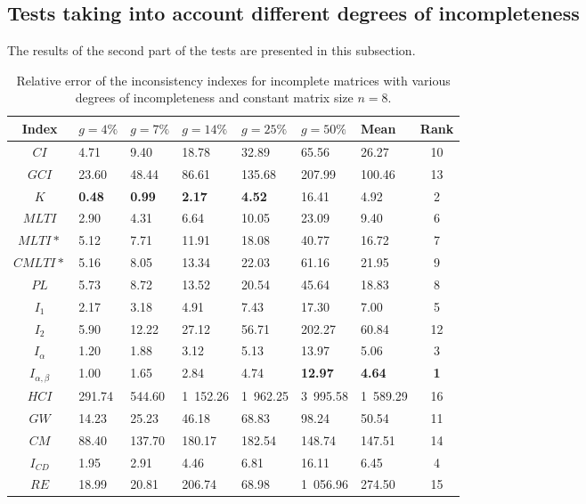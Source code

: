 \subsection{Tests taking into account different degrees of incompleteness}
The results of the second part of the tests are presented in this subsection.
\begin{table}[ht]
\begin{center}
\caption{Relative error of the inconsistency indexes for incomplete matrices with various degrees of incompleteness and constant matrix size $n=8$.}
\label{tab:results2}
\begin{tabular}{|c||lllll||l|c|}
\hline Index & $g=4\%$ & $g=7\%$ & $g=14\%$ & $g=25\%$ & $g=50\%$ & Mean & Rank \\ \hline \hline
$CI$ & 4.71 & 9.40 & 18.78 & 32.89 & 65.56 & 26.27 & 10 \\ \hline
$GCI$ & 23.60 & 48.44 & 86.61 & 135.68 & 207.99 & 100.46  & 13 \\ \hline
$K$ & \textbf{0.48} & \textbf{0.99} & \textbf{2.17} & \textbf{4.52} & 16.41 & 4.92 & 2 \\ \hline
$MLTI$ & 2.90 & 4.31 & 6.64 & 10.05 & 23.09 & 9.40 & 6 \\ \hline
$MLTI*$ & 5.12 & 7.71 & 11.91 & 18.08 & 40.77 & 16.72 & 7 \\ \hline
$CMLTI*$ & 5.16 & 8.05 & 13.34 & 22.03 & 61.16 & 21.95 & 9 \\ \hline
$PL$ & 5.73 & 8.72 & 13.52 & 20.54 & 45.64 & 18.83 & 8 \\ \hline
$I_1$ & 2.17 & 3.18 & 4.91 & 7.43 & 17.30 & 7.00 & 5 \\ \hline
$I_2$ & 5.90 & 12.22 & 27.12 & 56.71 & 202.27 & 60.84 & 12 \\ \hline
$I_{\alpha}$ & 1.20 & 1.88 & 3.12 & 5.13 & 13.97 & 5.06 & 3 \\ \hline
$I_{\alpha,\beta}$ & 1.00 & 1.65 & 2.84 & 4.74 & \textbf{12.97} & \textbf{4.64} & \textbf{1} \\ \hline
$HCI$ & 291.74 & 544.60 & 1 152.26 & 1 962.25 & 3 995.58 & 1 589.29 & 16 \\ \hline
$GW$ & 14.23 & 25.23 & 46.18 & 68.83 & 98.24 & 50.54 & 11 \\ \hline
$CM$ & 88.40 & 137.70 & 180.17 & 182.54 & 148.74 & 147.51 & 14 \\ \hline
$I_{CD}$ & 1.95 & 2.91 & 4.46 & 6.81 & 16.11 & 6.45 & 4 \\ \hline
$RE$ & 18.99 & 20.81 & 206.74 & 68.98 & 1 056.96 & 274.50 & 15 \\ \hline
\end{tabular}
\end{center}
\end{table}

